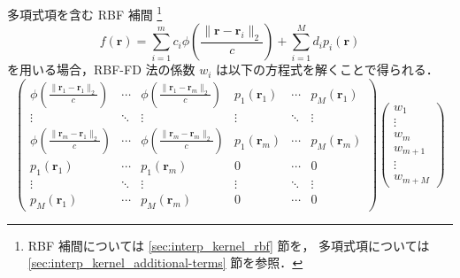 多項式項を含む RBF 補間
\footnote{RBF 補間については \ref{sec:interp_kernel_rbf} 節を，%
    多項式項については \ref{sec:interp_kernel_additional-terms} 節を参照．}%
\begin{equation}
    f(\bm{r}) = \sum_{i=1}^m c_i \phi\left(\frac{\|\bm{r} - \bm{r}_i\|_2}{c}\right) + \sum_{i=1}^M d_i p_i(\bm{r})
\end{equation}
を用いる場合，RBF-FD 法の係数 $w_i$ は以下の方程式を解くことで得られる．
\begin{equation}
    \begin{pmatrix}
        \phi\left(\frac{\|\bm{r}_1 - \bm{r}_1\|_2}{c}\right) & \cdots & \phi\left(\frac{\|\bm{r}_1 - \bm{r}_m\|_2}{c}\right) &
        p_1(\bm{r}_1)                                        & \cdots & p_M(\bm{r}_1)                                          \\
        \vdots                                               & \ddots & \vdots                                               &
        \vdots                                               & \ddots & \vdots                                                 \\
        \phi\left(\frac{\|\bm{r}_m - \bm{r}_1\|_2}{c}\right) & \cdots & \phi\left(\frac{\|\bm{r}_m - \bm{r}_m\|_2}{c}\right) &
        p_1(\bm{r}_m)                                        & \cdots & p_M(\bm{r}_m)                                          \\
        p_1(\bm{r}_1)                                        & \cdots & p_1(\bm{r}_m)                                        &
        0                                                    & \cdots & 0                                                      \\
        \vdots                                               & \ddots & \vdots                                               &
        \vdots                                               & \ddots & \vdots                                                 \\
        p_M(\bm{r}_1)                                        & \cdots & p_M(\bm{r}_m)                                        &
        0                                                    & \cdots & 0
    \end{pmatrix}
    \begin{pmatrix}
        w_1 \\ \vdots \\ w_m \\ w_{m+1} \\ \vdots \\ w_{m+M}

\end{pmatrix}
\end{equation}
